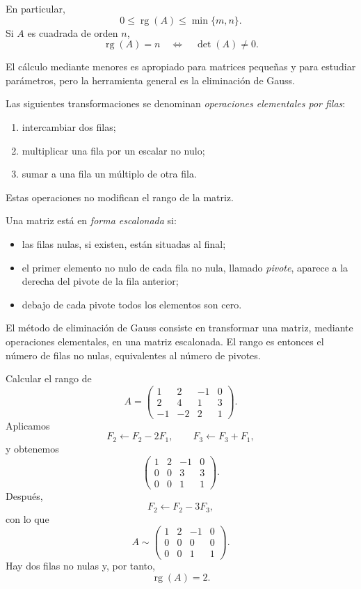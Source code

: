 En particular,
\[
0\leq\operatorname{rg}(A)\leq\min\{m,n\}.
\]
Si $A$ es cuadrada de orden $n$,
\[
\operatorname{rg}(A)=n
\quad\Longleftrightarrow\quad
\det(A)\neq0.
\]

El cálculo mediante menores es apropiado para matrices pequeñas y para estudiar parámetros, pero la herramienta general es la eliminación de Gauss.

\begin{definition}
Las siguientes transformaciones se denominan \emph{operaciones elementales por filas}:
\begin{enumerate}[label=\roman*)]
\item intercambiar dos filas;
\item multiplicar una fila por un escalar no nulo;
\item sumar a una fila un múltiplo de otra fila.
\end{enumerate}
\end{definition}

Estas operaciones no modifican el rango de la matriz.

\begin{definition}
Una matriz está en \emph{forma escalonada} si:
\begin{itemize}
\item las filas nulas, si existen, están situadas al final;
\item el primer elemento no nulo de cada fila no nula, llamado \emph{pivote}, aparece a la derecha del pivote de la fila anterior;
\item debajo de cada pivote todos los elementos son cero.
\end{itemize}
\end{definition}

El método de eliminación de Gauss consiste en transformar una matriz, mediante operaciones elementales, en una matriz escalonada. El rango es entonces el número de filas no nulas, equivalentes al número de pivotes.

\begin{example}
Calcular el rango de
\[
A=
\begin{pmatrix}
1&2&-1&0\\
2&4&1&3\\
-1&-2&2&1
\end{pmatrix}.
\]
Aplicamos
\[
F_2\leftarrow F_2-2F_1,
\qquad
F_3\leftarrow F_3+F_1,
\]
y obtenemos
\[
\begin{pmatrix}
1&2&-1&0\\
0&0&3&3\\
0&0&1&1
\end{pmatrix}.
\]
Después,
\[
F_2\leftarrow F_2-3F_3,
\]
con lo que
\[
A\sim
\begin{pmatrix}
1&2&-1&0\\
0&0&0&0\\
0&0&1&1
\end{pmatrix}.
\]
Hay dos filas no nulas y, por tanto,
\[
\boxed{\operatorname{rg}(A)=2.}
\]
\end{example}

